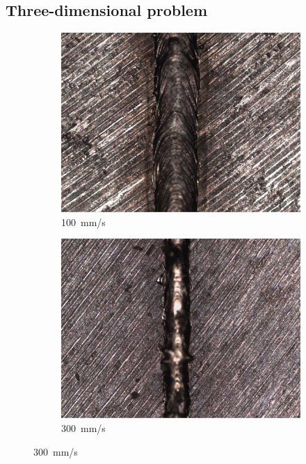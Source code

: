 \documentclass{article}
\begin{document}
\subsection{Three-dimensional problem}

\begin{figure}
    \centering
    \begin{subfigure}[b]{0.24\textwidth}
        \includegraphics[width=\textwidth]{experiment/photos/90W_V100}
        \caption{\SI{100}{mm/s}}
    \end{subfigure}\:
    \begin{subfigure}[b]{0.24\textwidth}
        \includegraphics[width=\textwidth]{experiment/photos/90W_V300}
        \caption{\SI{300}{mm/s}}

\end{subfigure}
\end{figure}
\end{document}
